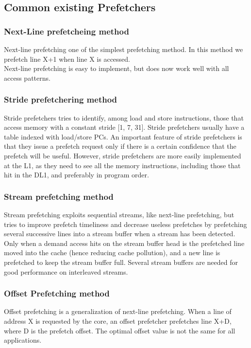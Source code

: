 \documentclass[a4paper]{article}
\begin{document}
    \subsection{Common existing Prefetchers}
        \subsubsection*{Next-Line prefetcheing method}
            Next-line prefetching one of the simplest prefetching method. In this method we prefetch line X+1 when line X is accessed. 
            \\ Next-line prefetching is easy to implement, but does now work well with all access patterns.
        
        \subsubsection*{Stride prefetchering method}
            Stride prefetchers tries to identify, among load and store instructions, those that access memory with a constant stride [1, 7, 31]. Stride prefetchers usually have a table indexed with load/store PCs. An important feature of stride prefetchers is that they issue a prefetch request only if there is a certain confidence that the prefetch will be useful. However, stride prefetchers are more easily implemented at the L1, as they need to see all the memory instructions, including those that hit in the DL1, and preferably in program order.
            
        \subsubsection*{Stream prefetching method}
            Stream prefetching exploits sequential streams, like next-line prefetching, but tries to improve prefetch timeliness and decrease useless prefetches by prefetching several successive lines into a stream buffer when a stream has been detected. Only when a demand access hits on the stream buffer head is the prefetched line moved into the cache (hence reducing cache pollution), and a new line is prefetched to keep the stream buffer full. Several stream buffers are needed for good performance on interleaved streams.
            
        \subsubsection*{Offset Prefetching method}
        Offset prefetching is a generalization of next-line prefetching. When a line of address X is requested by the core, an offset prefetcher prefetches line X+D, where D is the prefetch offset. The optimal offset value is not the same for all applications. 
        
\end{document}
